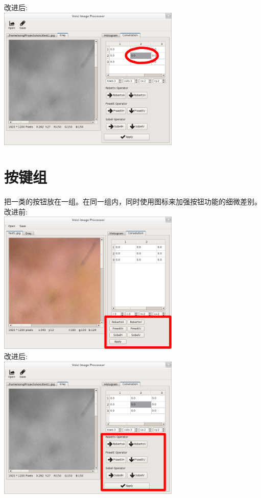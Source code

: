 \documentclass[10pt,a4paper]{article}
\begin{document}
改进后:\\
\indent\includegraphics[width=0.65\textwidth]{item_improved.png}

\pagebreak

\section{按键组}
把一类的按钮放在一组。在同一组内，同时使用图标来加强按钮功能的细微差别。\\

改进前:\\
\indent\includegraphics[width=0.65\textwidth]{icon_and_group_origin.png}\\

改进后:\\
\indent\includegraphics[width=0.65\textwidth]{icon_and_group_improved.png}
\end{document}
